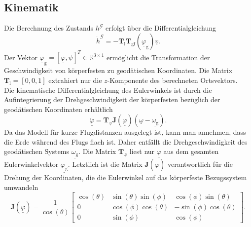 \subsection{Kinematik}
Die Berechnung des Zustands $h^\mathcal{G}$ erfolgt über die Differentialgleichung 
\begin{equation}
\label{fun:hoehe}
\dot{h}^\mathcal{G} = -\textbf{T}_\mathrm{l}\textbf{T}_\mathrm{gf}(\underline{\varphi}_\mathrm{g})\underline{v}.
\end{equation}
Der Vektor $\underline{\varphi}_\mathrm{g} = [\underline{\varphi},\psi]^T \in \mathbb{R}^{3\times 1}$ ermöglicht die Transformation der Geschwindigkeit von körperfesten zu geodätischen Koordinaten. Die Matrix $\textbf{T}_\mathrm{l} = [0, 0, 1]$ extrahiert nur die $z$-Komponente des berechneten Ortsvektors.\\
Die kinematische Differentialgleichung des Eulerwinkels ist durch die Aufintegrierung der Drehgeschwindigkeit der körperfesten bezüglich der geodätischen Koordinaten erhältlich
\begin{equation}
\label{fun:KinEuler}
\underline{\dot{\varphi}} = \textbf{T}_\mathrm{\varphi}\textbf{J}(\underline{\varphi})(\underline{\omega}-\underline{\omega_\mathrm{g}}).
\end{equation}
Da das Modell für kurze Flugdistanzen ausgelegt ist, kann man annehmen, dass die Erde während des Flugs flach ist. Daher entfällt die Drehgeschwindigkeit des geodätischen Systems $\underline{\omega_\mathrm{g}}$. Die Matrix $\textbf{T}_\mathrm{\varphi}$ liest nur $\underline{\varphi}$ aus dem gesamten Eulerwinkelvektor $\underline{\varphi_\mathrm{g}}$. Letztlich ist die Matrix $\textbf{J}(\underline{\varphi})$ verantwortlich für die Drehung der Koordinaten, die die Eulerwinkel auf das körperfeste Bezugssystem umwandeln
\begin{equation}
\textbf{J}(\underline{\varphi}) = \dfrac{1}{\cos(\theta)}\begin{bmatrix} 
\cos(\theta) & \sin(\theta)\sin(\phi)&\cos(\phi)\sin(\theta)\\
0&\cos(\phi)\cos(\theta)&-\sin(\phi)\cos(\theta)\\
0&\sin(\phi)& \cos(\phi)
\end{bmatrix}.
\end{equation}
